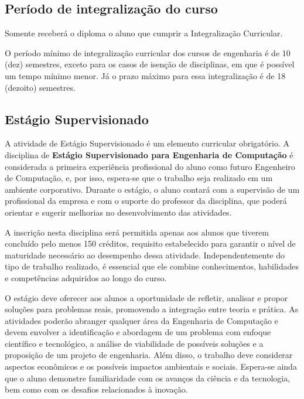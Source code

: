 \subsection{Período de integralização do curso}
\label{sec:integralizacao}
\setcounter{artigo}{98}
\begin{itquotation}
    \artigo Somente receberá o diploma o aluno que cumprir a Integralização Curricular.
\end{itquotation}

O período mínimo de integralização curricular dos cursos de engenharia é de 10 (dez) semestres, exceto para os casos de isenção de disciplinas, em que é possível um tempo mínimo menor. Já o prazo máximo para essa integralização é de 18 (dezoito) semestres.


\subsection{Estágio Supervisionado}

A atividade de Estágio Supervisionado é um elemento curricular obrigatório.
A disciplina de \textbf{Estágio Supervisionado para Engenharia de Computação} é considerada a primeira experiência profissional do aluno como futuro Engenheiro de Computação, e, por isso, espera-se que o trabalho seja realizado em um ambiente corporativo. Durante o estágio, o aluno contará com a supervisão de um profissional da empresa e com o suporte do professor da disciplina, que poderá orientar e sugerir melhorias no desenvolvimento das atividades.

A inscrição nesta disciplina será permitida apenas aos alunos que tiverem concluído pelo menos 150 créditos, requisito estabelecido para garantir o nível de maturidade necessário ao desempenho dessa atividade. Independentemente do tipo de trabalho realizado, é essencial que ele combine conhecimentos, habilidades e competências adquiridos ao longo do curso.

O estágio deve oferecer aos alunos a oportunidade de refletir, analisar e propor soluções para problemas reais, promovendo a integração entre teoria e prática. As atividades poderão abranger qualquer área da Engenharia de Computação e devem envolver a identificação e abordagem de um problema com enfoque científico e tecnológico, a análise de viabilidade de possíveis soluções e a proposição de um projeto de engenharia. Além disso, o trabalho deve considerar aspectos econômicos e os possíveis impactos ambientais e sociais. Espera-se ainda que o aluno demonstre familiaridade com os avanços da ciência e da tecnologia, bem como com os desafios relacionados à inovação.

